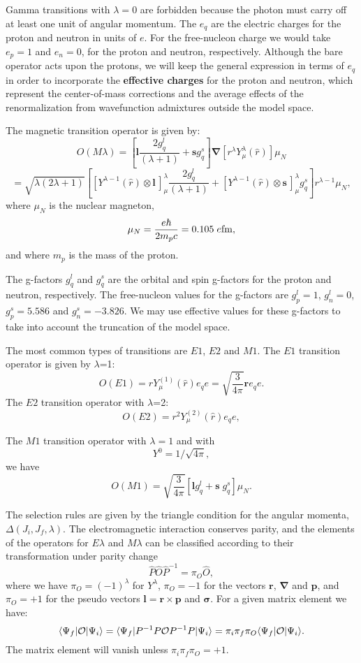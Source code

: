 \documentclass[graybox,sectrefs,envcountresetchap,open=right]{svmonodo}
\begin{document}
Gamma transitions
with $\lambda=0$ are forbidden because the photon must carry off
at least one unit of angular momentum. The $e_{q}$
are the electric charges for the proton and neutron in units of $  e  $.
For the free-nucleon
charge we would take $e_{p}=1$ and $e_{n}=0$, for the
proton and neutron, respectively.
Although the bare operator acts upon the protons,
we will keep the general expression in terms of $e_{q}$ in order
to incorporate the \textbf{effective charges} for the proton and
neutron, which represent the center-of-mass corrections and the
average effects of the renormalization from wavefunction
admixtures outside the model space.



The magnetic transition operator is given by:
\[
O(M\lambda)=\left[\mathbf{l}\frac{2g^{l }_{q}}{(\lambda +1)}+ \mathbf{s}g^{s}_{q}\right]\mathbf{\nabla}[r^{\lambda }Y^{\lambda }_{\mu }(\hat{r})]\mu _{N}
\]
\[
= \sqrt{\lambda (2\lambda +1)}\left[[Y^{\lambda -1}(\hat{r})\otimes \mathbf{l}\,]^{\lambda }_{\mu }\frac{2g^{l}_{q}}{(\lambda +1)}
+ [Y^{\lambda -1}(\hat{r})\otimes \mathbf{s}\,]^{\lambda }_{\mu }g^{s}_{q}\right]r^{\lambda -1}\mu _{N}, 
\]
 where $\mu_{N}$ is the nuclear magneton,
\[
\mu _{N}=\frac{e\hbar }{2m_{p}c} = 0.105 \; e {\rm fm}, 
\]
and where $m_{p}$ is the mass of the proton.


The g-factors $g^{l}_{q}$ and $g^{s}_{q}$
are the orbital and spin g-factors
for the proton and neutron, respectively.
The
free-nucleon values for the g-factors are $g^{l}_{p}=1$, $g^{l}_{n}=0$,
$g^{s}_{p}=5.586$ and $g^{s}_{n}=-3.826$. We may use effective values
for these g-factors to take into account the truncation of the model
space.


The most common types of transitions are $E1$, $E2$ and $M1$.
The $E1$ transition operator is given by $\lambda$=1:
\[
O(E1) = rY^{(1)}_{\mu }(\hat{r})e_{q} e= \sqrt{\frac{3}{4\pi }}\mathbf{r}e_{q} e.
\]
The $E2$ transition operator with $\lambda$=2:
\[
O(E2) = r^{2}Y^{(2)}_{\mu }(\hat{r})e_{q} e,  
\]



The $M1$ transition operator with $\lambda=1$ and with
\[
  Y^{0}=1/\sqrt{4\pi },
\]
we have
\[
O(M1)=\sqrt{\frac{3}{4\pi }}[\mathbf{l}g^{l }_{q}+\mathbf{s} \; g^{s}_{q}]\mu _{N}. 
\]


The selection rules are given by the triangle condition for the
angular momenta, $  \Delta (J_{i},J_{f},\lambda )  $. The electromagnetic
interaction conserves parity, and the elements of the
operators for $  E\lambda   $ and $  M\lambda   $
can be classified according to their transformation under parity
change
\[
\hat{P}\hat{O}\hat{P}^{-1}=\pi_{O}\hat{O}, 
\]
where we have $\pi _{O}=(-1)^{\lambda }$ for $Y^{\lambda }$,
$\pi _{O}=-1$ for the vectors
$\mathbf{r}$, $\mathbf{\nabla}$ and $\mathbf{p}$, and $  \pi _{O}=+1  $ for the 
pseudo vectors
$\mathbf{l}=\mathbf{r}\times\mathbf{p}$ and $\mathbf{\sigma}$. For a given matrix element we have:
\[
\langle\Psi _{f}\vert {\cal O}\vert \Psi _{i}\rangle =\langle\Psi _{f}\vert P^{-1}P{\cal O}P^{-1}P\vert \Psi _{i}\rangle=\pi _{i}\pi _{f}\pi _{O} \langle\Psi _{f}\vert {\cal O}\vert \Psi _{i}\rangle. 
\]
The matrix element will vanish unless  $\pi _{i}\pi _{f}\pi _{O}=+1$.
\end{document}
